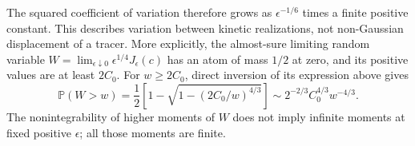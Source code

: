 The squared coefficient of variation therefore grows as
$\epsilon^{-1/6}$ times a finite positive constant. This describes
variation between kinetic realizations, not non-Gaussian displacement
of a tracer. More explicitly, the almost-sure limiting random variable
$W=\lim_{\epsilon\downarrow0}\epsilon^{1/4}J_\epsilon(c)$ has an atom
of mass $1/2$ at zero, and its positive values are at least $2C_0$.
For $w\ge2C_0$, direct inversion of its expression above gives
\begin{equation}\label{eq:cosine-limit-law}
 \mathbb P(W>w)=\frac12\left[1-
           \sqrt{1-(2C_0/w)^{4/3}}\right]
 \sim2^{-2/3}C_0^{4/3}w^{-4/3}.
\end{equation}
The nonintegrability of higher moments of $W$ does not imply infinite
moments at fixed positive $\epsilon$; all those moments are finite.

